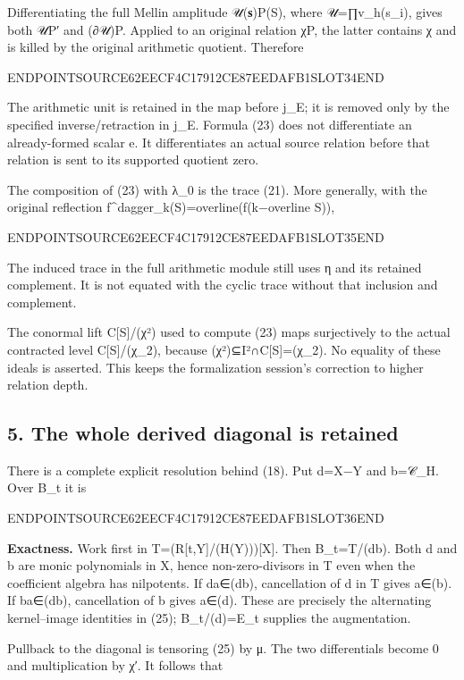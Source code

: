 Differentiating the full Mellin amplitude 𝒰(𝐬)P(S), where 𝒰=∏v\_h(s\_i), gives both 𝒰P′ and (∂𝒰)P. Applied to an original relation χP, the latter contains χ and is killed by the original arithmetic quotient. Therefore

ENDPOINTSOURCE62EECF4C17912CE87EEDAFB1SLOT34END

The arithmetic unit is retained in the map before j\_E; it is removed only by the specified inverse/retraction in j\_E. Formula (23) does not differentiate an already-formed scalar e. It differentiates an actual source relation before that relation is sent to its supported quotient zero.

The composition of (23) with λ\_0 is the trace (21). More generally, with the original reflection f\^{}dagger\_k(S)=overline(f(k−overline S)),

ENDPOINTSOURCE62EECF4C17912CE87EEDAFB1SLOT35END

The induced trace in the full arithmetic module still uses η and its retained complement. It is not equated with the cyclic trace without that inclusion and complement.

The conormal lift C{[}S{]}/(χ²) used to compute (23) maps surjectively to the actual contracted level C{[}S{]}/(χ\_2), because (χ²)⊆I²∩C{[}S{]}=(χ\_2). No equality of these ideals is asserted. This keeps the formalization session's correction to higher relation depth.

\subsection{5. The whole derived diagonal is retained}\label{endpoint-sga_trace_period--the-whole-derived-diagonal-is-retained}

There is a complete explicit resolution behind (18). Put d=X−Y and b=𝒞\_H. Over B\_t it is

ENDPOINTSOURCE62EECF4C17912CE87EEDAFB1SLOT36END

\textbf{Exactness.} Work first in T=(R{[}t,Y{]}/(H(Y))){[}X{]}. Then B\_t=T/(db). Both d and b are monic polynomials in X, hence non-zero-divisors in T even when the coefficient algebra has nilpotents. If da∈(db), cancellation of d in T gives a∈(b). If ba∈(db), cancellation of b gives a∈(d). These are precisely the alternating kernel--image identities in (25); B\_t/(d)=E\_t supplies the augmentation.

Pullback to the diagonal is tensoring (25) by μ. The two differentials become 0 and multiplication by χ′. It follows that

